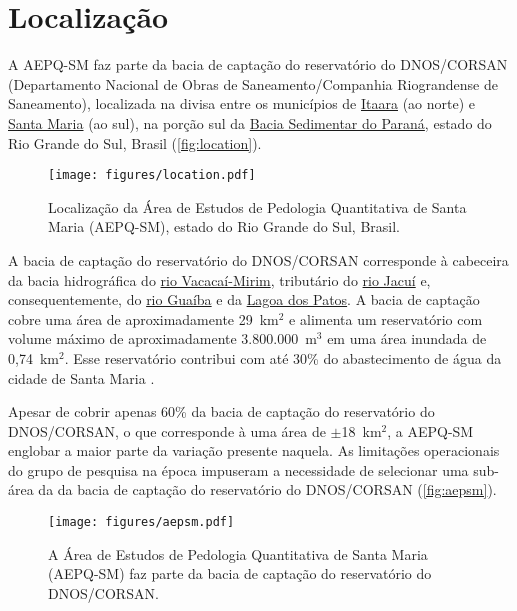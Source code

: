 \section{Localização}

A AEPQ-SM faz parte da bacia de captação do reservatório do DNOS/CORSAN (Departamento Nacional de Obras de Saneamento/Companhia Riograndense de Saneamento), localizada na divisa entre os municípios de \href{http://pt.wikipedia.org/wiki/Itaara}{Itaara} (ao norte) e \href{http://pt.wikipedia.org/wiki/Santa_Maria_\%28Rio_Grande_do_Sul\%29}{Santa Maria} (ao sul), na porção sul da \href{http://pt.wikipedia.org/wiki/Bacia_do_Paran\%C3\%A1}{Bacia Sedimentar do Paraná}, estado do Rio Grande do Sul, Brasil (\autoref{fig:location}).

\begin{figure}[ht]
  \centering
  \texttt{[image: figures/location.pdf]}
  \caption{Localização da Área de Estudos de Pedologia Quantitativa de Santa 
  Maria (AEPQ-SM), estado do Rio Grande do Sul, Brasil.}
  \label{fig:location}
\end{figure}

A bacia de captação do reservatório do DNOS/CORSAN corresponde à cabeceira da bacia hidrográfica do \href{http://pt.wikipedia.org/wiki/Rio_Vacaca\%C3\%AD-Mirim}{rio Vacacaí-Mirim}, tributário do \href{http://pt.wikipedia.org/wiki/Rio_Jacu\%C3\%AD}{rio Jacuí} e, consequentemente, do \href{http://pt.wikipedia.org/wiki/Lago_Gua\%C3\%ADba}{rio Guaíba} e da \href{http://pt.wikipedia.org/wiki/Lagoa_dos_Patos}{Lagoa dos Patos}. A bacia de captação cobre uma área de aproximadamente 29~km$^2$ e alimenta um reservatório com volume máximo de aproximadamente 3.800.000~m$^3$ em uma área inundada de 0,74~km$^2$. Esse reservatório contribui com até 30\% do abastecimento de água da cidade de Santa Maria \cite{Dias2003, DillEtAl2004, Miguel2010}.

Apesar de cobrir apenas 60\% da bacia de captação do reservatório do DNOS/CORSAN, o que corresponde à uma área de $\pm$18~km$^2$, a AEPQ-SM englobar a maior parte da variação presente naquela. As limitações operacionais do grupo de pesquisa na época impuseram a necessidade de selecionar uma sub-área da da bacia de captação do reservatório do DNOS/CORSAN (\autoref{fig:aepsm}).

\begin{figure}[ht]
  \centering
  \texttt{[image: figures/aepsm.pdf]}
  \caption{A Área de Estudos de Pedologia Quantitativa de Santa Maria (AEPQ-SM) faz parte da bacia de captação do reservatório do DNOS/CORSAN.}
  \label{fig:aepsm}
\end{figure}

